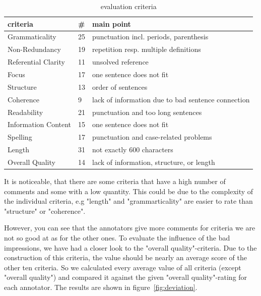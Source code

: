 \begin{table}[H]
	\begin{tabularx}{\textwidth}{llX} \toprule
		criteria & \# & main point \\ \midrule
		Grammaticality      & 25 & punctuation incl. periods, parenthesis  \\
		Non-Redundancy      & 19 & repetition resp. multiple definitions \\
		Referential Clarity & 11 & unsolved reference \\
		Focus               & 17 & one sentence does not fit \\
		Structure           & 13 & order of sentences \\
		Coherence           & 9  & lack of information due to bad sentence connection \\
		Readability         & 21 & punctuation and too long sentences \\
		Information Content & 15 & one sentence does not fit \\
		Spelling            & 17 & punctuation and case-related problems \\
		Length              & 31 & not exactly 600 characters \\
		Overall Quality     & 14 & lack of information, structure, or length \\ \bottomrule
	\end{tabularx}
	\caption{evaluation criteria}
	\label{tab:evacomments}
\end{table}

It is noticeable, that there are some criteria that have a high number of comments and some with a low quantity.
This could be due to the complexity of the individual criteria, e.g "length" and "grammarticality" are easier to rate than "structure" or "coherence".

However, you can see that the annotators give more comments for criteria we are not so good at as for the other ones.
To evaluate the influence of the bad impressions, we have had a closer look to the "overall quality"-criteria.
Due to the construction of this criteria, the value should be nearly an average score of the other ten criteria.
So we calculated every average value of all criteria (except "overall quality") and compared it against the given "overall quality"-rating for each annotator.
The results are shown in figure~\ref{fig:deviation}.

